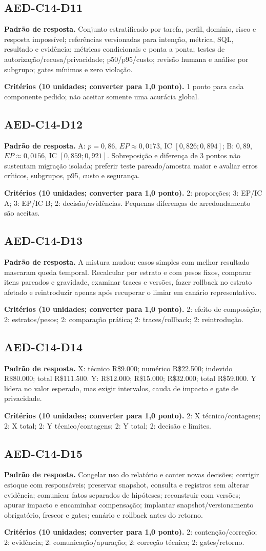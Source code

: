 \documentclass[10pt,a4paper]{article}
\newcommand{\Disc}[3]{\subsection*{#1}\textbf{Padrão de resposta.} #2\par\smallskip\textbf{Critérios (10 unidades; converter para 1,0 ponto).} #3}
\begin{document}
\Disc{AED-C14-D11}{Conjunto estratificado por tarefa, perfil, domínio, risco e resposta impossível; referências versionadas para intenção, métrica, SQL, resultado e evidência; métricas condicionais e ponta a ponta; testes de autorização/recusa/privacidade; p50/p95/custo; revisão humana e análise por subgrupo; gates mínimos e zero violação.}{1 ponto para cada componente pedido; não aceitar somente uma acurácia global.}
\Disc{AED-C14-D12}{A: $p=0{,}86$, $EP\approx0{,}0173$, IC $[0{,}826;0{,}894]$; B: $0{,}89$, $EP\approx0{,}0156$, IC $[0{,}859;0{,}921]$. Sobreposição e diferença de 3 pontos não sustentam migração isolada; preferir teste pareado/amostra maior e avaliar erros críticos, subgrupos, p95, custo e segurança.}{2: proporções; 3: EP/IC A; 3: EP/IC B; 2: decisão/evidências. Pequenas diferenças de arredondamento são aceitas.}
\Disc{AED-C14-D13}{A mistura mudou: casos simples com melhor resultado mascaram queda temporal. Recalcular por estrato e com pesos fixos, comparar itens pareados e gravidade, examinar traces e versões, fazer rollback no estrato afetado e reintroduzir apenas após recuperar o limiar em canário representativo.}{2: efeito de composição; 2: estratos/pesos; 2: comparação prática; 2: traces/rollback; 2: reintrodução.}
\Disc{AED-C14-D14}{X: técnico R\$9.000; numérico R\$22.500; indevido R\$80.000; total R\$111.500. Y: R\$12.000; R\$15.000; R\$32.000; total R\$59.000. Y lidera no valor esperado, mas exigir intervalos, cauda de impacto e gate de privacidade.}{2: X técnico/contagens; 2: X total; 2: Y técnico/contagens; 2: Y total; 2: decisão e limites.}
\Disc{AED-C14-D15}{Congelar uso do relatório e conter novas decisões; corrigir estoque com responsáveis; preservar snapshot, consulta e registros sem alterar evidência; comunicar fatos separados de hipóteses; reconstruir com versões; apurar impacto e encaminhar compensação; implantar snapshot/versionamento obrigatório, frescor e gates; canário e rollback antes do retorno.}{2: contenção/correção; 2: evidência; 2: comunicação/apuração; 2: correção técnica; 2: gates/retorno.}
\end{document}
